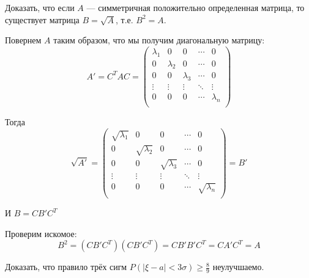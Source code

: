 \begin{exercise}
    Доказать, что если \(A\) --- симметричная положительно определенная матрица, то существует матрица \(B = \sqrt{A}\), т.е. \(B^2 = A\).
\end{exercise}
\begin{solution}
    Повернем \(A\) таким образом, что мы получим диагональную матрицу:
    \[A' = C^T A C = \begin{pmatrix}
        \lambda_1 & 0 & 0 & \cdots & 0 \\
        0 & \lambda_2 & 0 & \cdots & 0 \\
        0 & 0 & \lambda_3 & \cdots & 0 \\
        \vdots & \vdots & \vdots & \ddots & \vdots \\
        0 & 0 & 0 & \cdots & \lambda_n \\
    \end{pmatrix}\]
    
    Тогда
    \[\sqrt{A'} = \begin{pmatrix}
        \sqrt{\lambda_1} & 0 & 0 & \cdots & 0 \\
        0 & \sqrt{\lambda_2}  & 0 & \cdots & 0 \\
        0 & 0 & \sqrt{\lambda_3}  & \cdots & 0 \\
        \vdots & \vdots & \vdots & \ddots & \vdots \\
        0 & 0 & 0 & \cdots & \sqrt{\lambda_n}  \\
    \end{pmatrix} = B'\]
    
    И \(B = C B' C^T\)
    
    Проверим искомое:
    \[B^2 = (CB'C^T)(CB'C^T) = CB'B'C^T = CA'C^T = A\]
\end{solution}

\begin{exercise}
    Доказать, что правило трёх сигм \(P(|\xi - a| < 3\sigma) \geq \frac{8}{9}\) неулучшаемо.
\end{exercise}



